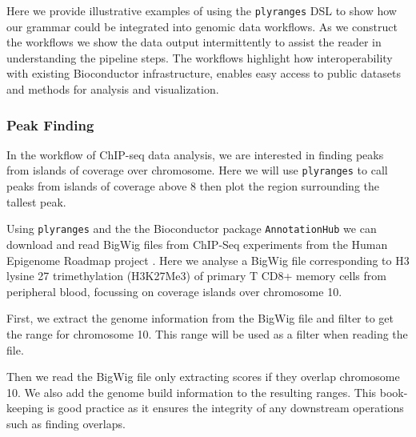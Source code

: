 \documentclass[]{article}
\newenvironment{Shaded}{\begin{snugshade}}{\end{snugshade}}
\newcommand{\KeywordTok}[1]{\textcolor[rgb]{0.13,0.29,0.53}{\textbf{#1}}}
\newcommand{\NormalTok}[1]{#1}
\newcommand{\OperatorTok}[1]{\textcolor[rgb]{0.81,0.36,0.00}{\textbf{#1}}}
\newcommand{\StringTok}[1]{\textcolor[rgb]{0.31,0.60,0.02}{#1}}
\begin{document}
Here we provide illustrative examples of using the \texttt{plyranges}
DSL to show how our grammar could be integrated into genomic data
workflows. As we construct the workflows we show the data output
intermittently to assist the reader in understanding the pipeline steps.
The workflows highlight how interoperability with existing Bioconductor
infrastructure, enables easy access to public datasets and methods for
analysis and visualization.

\hypertarget{peak-finding}{%
\subsubsection{Peak Finding}\label{peak-finding}}

In the workflow of ChIP-seq data analysis, we are interested in finding
peaks from islands of coverage over chromosome. Here we will use
\texttt{plyranges} to call peaks from islands of coverage above 8 then
plot the region surrounding the tallest peak.

Using \texttt{plyranges} and the the Bioconductor package
\texttt{AnnotationHub} \cite{R-ahub} we can download and read BigWig
files from ChIP-Seq experiments from the Human Epigenome Roadmap project
\cite{Roadmap-Epigenomics-Consortium2015-pr}. Here we analyse a BigWig
file corresponding to H3 lysine 27 trimethylation (H3K27Me3) of primary
T CD8+ memory cells from peripheral blood, focussing on coverage islands
over chromosome 10.

First, we extract the genome information from the BigWig file and filter
to get the range for chromosome 10. This range will be used as a filter
when reading the file.

\begin{Shaded}
\end{Shaded}

Then we read the BigWig file only extracting scores if they overlap
chromosome 10. We also add the genome build information to the resulting
ranges. This book-keeping is good practice as it ensures the integrity
of any downstream operations such as finding overlaps.
\end{document}
